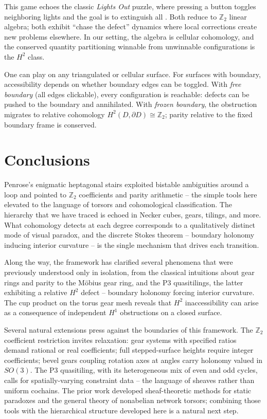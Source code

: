 \documentclass[11pt]{amsart}  %
\theoremstyle{plain}
\theoremstyle{definition}
\theoremstyle{remark}
\newcommand{\style}[1]{{\em #1}} %
\newcommand{\Z}{\mathbb{Z}} %
\begin{document}
This game echoes the classic \emph{Lights Out} puzzle, where pressing a button toggles neighboring lights and the goal is to extinguish all \cite{AndersonFeil1998LightsOut}. Both reduce to $\Z_2$ linear algebra; both exhibit ``chase the defect'' dynamics where local corrections create new problems elsewhere. In our setting, the algebra is cellular cohomology, and the conserved quantity partitioning winnable from unwinnable configurations is the $H^2$ class.

One can play on any triangulated or cellular surface. 
For surfaces with boundary, accessibility depends on whether boundary edges can be toggled. With \style{free boundary} (all edges clickable), every configuration is reachable: defects can be pushed to the boundary and annihilated. With \style{frozen boundary}, the obstruction migrates to relative cohomology $H^2(D, \partial D) \cong \Z_2$; parity relative to the fixed boundary frame is conserved.

\section{Conclusions}
\label{sec:conc}

Penrose's enigmatic heptagonal stairs exploited bistable ambiguities around a loop and pointed to $\Z_2$ coefficients and parity arithmetic -- the simple tools here elevated to the language of torsors and cohomological classification. The hierarchy that we have traced is echoed in Necker cubes, gears, tilings, and more. What cohomology detects at each degree corresponds to a qualitatively distinct mode of visual paradox, and the discrete Stokes theorem -- boundary holonomy inducing interior curvature -- is the single mechanism that drives each transition.

Along the way, the framework has clarified several phenomena that were previously understood only in isolation, from the classical intuitions about gear rings and parity to the M\"obius gear ring, and the P3 quasitilings, the latter exhibiting a relative $H^2$ defect -- boundary holonomy forcing interior curvature. The cup product on the torus gear mesh reveals that $H^2$ inaccessibility can arise as a consequence of independent $H^1$ obstructions on a closed surface.

Several natural extensions press against the boundaries of this framework. The $\Z_2$ coefficient restriction invites relaxation: gear systems with specified ratios demand rational or real coefficients; full stepped-surface heights require integer coefficients; bevel gears coupling rotation axes at angles carry holonomy valued in $SO(3)$. The P3 quasitiling, with its heterogeneous mix of even and odd cycles, calls for spatially-varying constraint data -- the language of sheaves rather than uniform cochains. The prior work \cite{GhristCooperband2025Obstructions} developed sheaf-theoretic methods for static paradoxes and the general theory of nonabelian network torsors; combining those tools with the hierarchical structure developed here is a natural next step.
\end{document}
